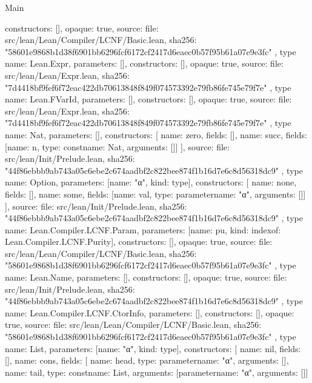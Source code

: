 \begin{lexlean}{Main}
\begin{toolingmodule}
{{      constructors: [],
      opaque: true,
      source: {
        file: src/lean/Lean/Compiler/LCNF/Basic.lean,
        sha256: "58601e9868b1d38f6901bb6296fcf6172cf2417d6eaec0b57f95b61a07e9e3fc"
      }
    },
    type{
      name: Lean.Expr,
      parameters: [],
      constructors: [],
      opaque: true,
      source: {
        file: src/lean/Lean/Expr.lean,
        sha256: "7d4418bf9fef6f72eac422db70613848f849f074573392e79fb86fe745e79f7e"
      }
    },
    type{
      name: Lean.FVarId,
      parameters: [],
      constructors: [],
      opaque: true,
      source: {
        file: src/lean/Lean/Expr.lean,
        sha256: "7d4418bf9fef6f72eac422db70613848f849f074573392e79fb86fe745e79f7e"
      }
    },
    type{
      name: Nat,
      parameters: [],
      constructors: [
        {name: zero, fields: []},
        {name: succ, fields: [{name: n, type: const{name: Nat, arguments: []}}]}
      ],
      source: {
        file: src/lean/Init/Prelude.lean,
        sha256: "44f86ebbb9ab743a05c6ebe2c674aadbf2c822bee874f1b16d7e6c8d56318dc9"
      }
    },
    type{
      name: Option,
      parameters: [{name: "α", kind: type{}}],
      constructors: [
        {name: none, fields: []},
        {name: some, fields: [{name: val, type: parameter{name: "α", arguments: []}}]}
      ],
      source: {
        file: src/lean/Init/Prelude.lean,
        sha256: "44f86ebbb9ab743a05c6ebe2c674aadbf2c822bee874f1b16d7e6c8d56318dc9"
      }
    },
    type{
      name: Lean.Compiler.LCNF.Param,
      parameters: [{name: pu, kind: index{of: Lean.Compiler.LCNF.Purity}}],
      constructors: [],
      opaque: true,
      source: {
        file: src/lean/Lean/Compiler/LCNF/Basic.lean,
        sha256: "58601e9868b1d38f6901bb6296fcf6172cf2417d6eaec0b57f95b61a07e9e3fc"
      }
    },
    type{
      name: Lean.Name,
      parameters: [],
      constructors: [],
      opaque: true,
      source: {
        file: src/lean/Init/Prelude.lean,
        sha256: "44f86ebbb9ab743a05c6ebe2c674aadbf2c822bee874f1b16d7e6c8d56318dc9"
      }
    },
    type{
      name: Lean.Compiler.LCNF.CtorInfo,
      parameters: [],
      constructors: [],
      opaque: true,
      source: {
        file: src/lean/Lean/Compiler/LCNF/Basic.lean,
        sha256: "58601e9868b1d38f6901bb6296fcf6172cf2417d6eaec0b57f95b61a07e9e3fc"
      }
    },
    type{
      name: List,
      parameters: [{name: "α", kind: type{}}],
      constructors: [
        {name: nil, fields: []},
        {
          name: cons,
          fields: [
            {name: head, type: parameter{name: "α", arguments: []}},
            {name: tail, type: const{name: List, arguments: [parameter{name: "α", arguments: []}]}}
}}}
\end{toolingmodule}
\end{lexlean}
